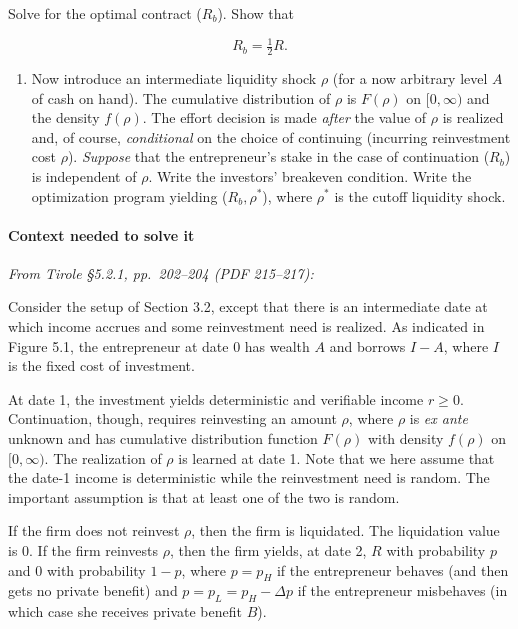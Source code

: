 \documentclass[11pt,a4paper]{article}
\providecommand{\tightlist}{\setlength{\itemsep}{0pt}\setlength{\parskip}{0pt}}
\begin{document}
Solve for the optimal contract (\(R_b\)). Show that

\[R_b = \tfrac{1}{2}R.\]

\begin{enumerate}
\def\labelenumi{(\roman{enumi})}
\setcounter{enumi}{1}
\tightlist
\item
  Now introduce an intermediate liquidity shock \(\rho\) (for a now arbitrary level \(A\) of cash on
  hand). The cumulative distribution of \(\rho\) is \(F(\rho)\) on \([0, \infty)\) and the density
  \(f(\rho)\). The effort decision is made \emph{after} the value of \(\rho\) is realized and, of
  course, \emph{conditional} on the choice of continuing (incurring reinvestment cost \(\rho\)).
  \emph{Suppose} that the entrepreneur's stake in the case of continuation (\(R_b\)) is independent
  of \(\rho\). Write the investors' breakeven condition. Write the optimization program yielding
  (\(R_b, \rho^*\)), where \(\rho^*\) is the cutoff liquidity shock.
\end{enumerate}

\paragraph{Context needed to solve it}

\emph{From Tirole §5.2.1, pp.~202--204 (PDF 215--217):}

Consider the setup of Section 3.2, except that there is an intermediate date at which income accrues
and some reinvestment need is realized. As indicated in Figure 5.1, the entrepreneur at date 0 has
wealth \(A\) and borrows \(I - A\), where \(I\) is the fixed cost of investment.

At date 1, the investment yields deterministic and verifiable income \(r \geqslant 0\).
Continuation, though, requires reinvesting an amount \(\rho\), where \(\rho\) is \emph{ex ante}
unknown and has cumulative distribution function \(F(\rho)\) with density \(f(\rho)\) on
\([0, \infty)\). The realization of \(\rho\) is learned at date 1. Note that we here assume that the
date-1 income is deterministic while the reinvestment need is random. The important assumption is
that at least one of the two is random.

If the firm does not reinvest \(\rho\), then the firm is liquidated. The liquidation value is 0. If
the firm reinvests \(\rho\), then the firm yields, at date 2, \(R\) with probability \(p\) and 0
with probability \(1 - p\), where \(p = p_H\) if the entrepreneur behaves (and then gets no private
benefit) and \(p = p_L = p_H - \Delta p\) if the entrepreneur misbehaves (in which case she receives
private benefit \(B\)).
\end{document}
